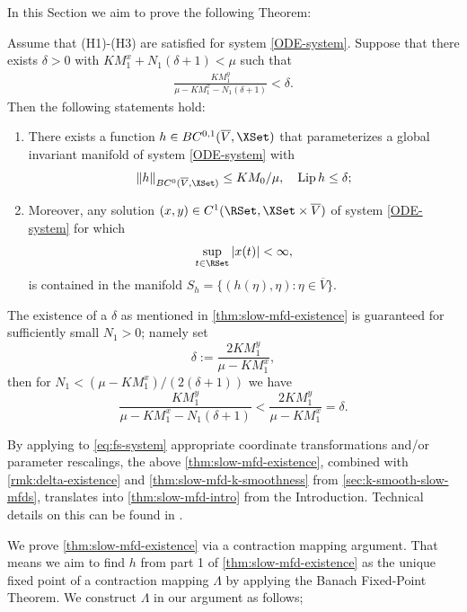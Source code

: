 \documentclass[a4paper]{siamart190516}
\newcommand{\Lip}{\text{Lip}}
\begin{document}
In this Section we aim to prove the following Theorem:
 \begin{theorem}\label{thm:slow-mfd-existence}
Assume that (H1)-(H3) are satisfied for system \cref{ODE-system}. Suppose that there exists $\delta > 0$ with $K M_1^x+N_1(\delta +1) < \mu$ such that
\begin{align*}
\frac{K M_1^y}{\mu-K M_1^x-N_1(\delta +1)}  < \delta.
\end{align*}
Then the following statements hold:
 \begin{enumerate}
 \item There exists a function $h \in BC^{0,1}(\overline{V},\XSet)$ that parameterizes a global invariant manifold of system \cref{ODE-system} with 
 \[
 \|h\|_{BC^{0}(\overline{V},\XSet)} \leq K M_0 / \mu, \quad \Lip \, h \leq \delta;
 \]
 \item Moreover, any solution $(x,y) \in C^1(\RSet, \XSet \times \overline{V})$ of system \cref{ODE-system} for which
 \[
 \sup_{t \in \RSet} | x(t) | < \infty,
 \]
is contained in the manifold $S_h = \{ (h(\eta),\eta) : \eta \in \overline{V} \}$.
 \end{enumerate}
 \end{theorem}
 
 \begin{remark}\label{rmk:delta-existence}
 The existence of a $\delta$ as mentioned in \cref{thm:slow-mfd-existence} is
 guaranteed for sufficiently small $N_1 > 0$; namely set 
 \[
 \delta := \frac{2KM^y_1}{\mu - K M^x_1},
 \]
 then for $N_1 < (\mu-KM^x_1)/(2(\delta+1))$ we have
   \[
\frac{KM^y_1}{\mu - K M^x_1 - N_1(\delta+1)} < \frac{2KM^y_1}{\mu - K M^x_1} = \delta.
 \]
  \end{remark}
 
 \begin{remark}
 By applying to \cref{eq:fs-system} appropriate coordinate transformations and/or
 parameter rescalings, the above \cref{thm:slow-mfd-existence}, combined with
 \cref{rmk:delta-existence} and \cref{thm:slow-mfd-k-smoothness} from
 \cref{sec:k-smooth-slow-mfds}, translates into \cref{thm:slow-mfd-intro} from the Introduction.
 Technical details on this can be found in \cite{Do26}.
 \end{remark}
 
We prove \cref{thm:slow-mfd-existence} via a contraction mapping argument. That means
we aim to find $h$ from part 1 of \cref{thm:slow-mfd-existence} as the unique
fixed point of a contraction mapping $\Lambda$ by applying the Banach Fixed-Point
Theorem. We construct $\Lambda$ in our argument as follows;
\end{document}
